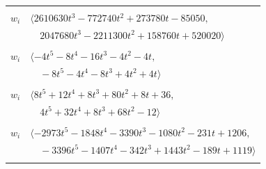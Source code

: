 \documentclass[11pt]{article}
\begin{document}
\begin{longtable}{@{}ll@{}}
\addlinespace[2pt]
\multicolumn{2}{@{}p{0.97\textwidth}@{}}{$i=44$, $D_i=228$, $e_i=2$, $\rho_{ij}$: $10{:}1, \allowbreak 11{:}1, \allowbreak 12{:}2, \allowbreak 24{:}2, \allowbreak 25{:}2, \allowbreak 30{:}2, \allowbreak 33{:}1, \allowbreak 35{:}1, \allowbreak 50{:}1, \allowbreak 53{:}1, \allowbreak 57{:}1$}\\
$w_i$ & $\langle 2610630t^{3}-772740t^{2}+273780t-85050,$\\
 & $\quad 2047680t^{3}-2211300t^{2}+158760t+520020\rangle$\\
\addlinespace[2pt]
\multicolumn{2}{@{}p{0.97\textwidth}@{}}{$i=45$, $D_i=4$, $\rho_{ij}$: $5{:}2, \allowbreak 29{:}2, \allowbreak 30{:}2, \allowbreak 35{:}1, \allowbreak 43{:}1, \allowbreak 47{:}1, \allowbreak 48{:}1$}\\
$w_i$ & $\langle -4t^{5}-8t^{4}-16t^{3}-4t^{2}-4t,$\\
 & $\quad -8t^{5}-4t^{4}-8t^{3}+4t^{2}+4t\rangle$\\
\addlinespace[2pt]
\multicolumn{2}{@{}p{0.97\textwidth}@{}}{$i=46$, $D_i=4$, $\rho_{ij}$: $8{:}2, \allowbreak 13{:}1, \allowbreak 26{:}2, \allowbreak 28{:}2, \allowbreak 30{:}1, \allowbreak 31{:}2, \allowbreak 34{:}1, \allowbreak 36{:}1, \allowbreak 47{:}1, \allowbreak 48{:}2$}\\
$w_i$ & $\langle 8t^{5}+12t^{4}+8t^{3}+80t^{2}+8t+36,$\\
 & $\quad 4t^{5}+32t^{4}+8t^{3}+68t^{2}-12\rangle$\\
\addlinespace[2pt]
\multicolumn{2}{@{}p{0.97\textwidth}@{}}{$i=47$, $D_i=1$, $\rho_{ij}$: $0{:}1, \allowbreak 1{:}1, \allowbreak 3{:}1, \allowbreak 6{:}2, \allowbreak 10{:}2, \allowbreak 14{:}1, \allowbreak 17{:}1, \allowbreak 29{:}2, \allowbreak 30{:}2, \allowbreak 31{:}2, \allowbreak 34{:}2, \allowbreak 36{:}1, \allowbreak 42{:}1, \allowbreak 45{:}2, \allowbreak 46{:}2, \allowbreak 49{:}1, \allowbreak 51{:}1, \allowbreak 56{:}2$}\\
$w_i$ & $\langle -2973t^{5}-1848t^{4}-3390t^{3}-1080t^{2}-231t+1206,$\\
 & $\quad -3396t^{5}-1407t^{4}-342t^{3}+1443t^{2}-189t+1119\rangle$\\
\addlinespace[2pt]
\multicolumn{2}{@{}p{0.97\textwidth}@{}}{$i=48$, $D_i=177885288$, $\rho_{ij}$: $0{:}1, \allowbreak 1{:}1, \allowbreak 3{:}2, \allowbreak 6{:}1, \allowbreak 7{:}1, \allowbreak 21{:}2, \allowbreak 22{:}1, \allowbreak 24{:}1, \allowbreak 28{:}1, \allowbreak 30{:}1, \allowbreak 34{:}1, \allowbreak 40{:}2, \allowbreak 45{:}2, \allowbreak 46{:}1, \allowbreak 51{:}1, \allowbreak 55{:}2, \allowbreak 57{:}2$}\\

\end{longtable}
\end{document}
